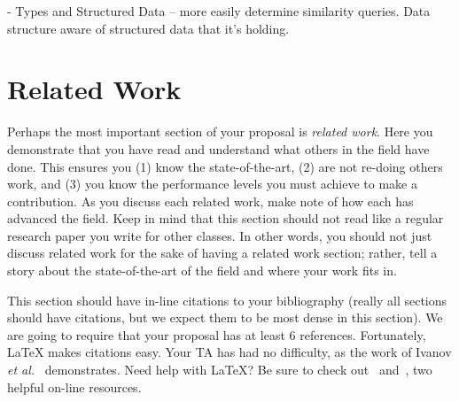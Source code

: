 \documentclass{sig-alternate}
\begin{document}
- Types and Structured Data -- more easily determine similarity queries. Data structure aware of structured data that it's holding.

%

\section{Related Work}
\label{sec:related_work}
Perhaps the most important section of your proposal is \textit{related
  work}. Here you demonstrate that you have read and understand what
others in the field have done. This ensures you (1) know the
state-of-the-art, (2) are not re-doing others work, and (3) you know
the performance levels you must achieve to make a contribution. As you
discuss each related work, make note of how each has advanced the
field. Keep in mind that this section should not read like a regular
research paper you write for other classes. In other words, you should
not just discuss related work for the sake of having a related work
section; rather, tell a story about the state-of-the-art of the field
and where your work fits in.

This section should have in-line citations to your bibliography
(really all sections should have citations, but we expect them to be
most dense in this section). We are going to require that your
proposal has at least $6$ references. Fortunately, \LaTeX{} makes
citations easy. Your TA has had no difficulty, as the work of Ivanov
\textit{et al.}~\cite{ivanov14} demonstrates. Need help with \LaTeX{}?
Be sure to check out~\cite{latex_wikibook} and~\cite{ctan_pdf}, two
helpful on-line resources.
\end{document}
